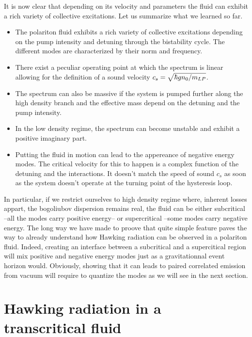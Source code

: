 \bigskip



It is now clear that depending on its velocity and parameters the fluid can exhibit a rich variety of collective excitations. Let us summarize what we learned so far.
\begin{tcolorbox}[infernoSummary]
    \begin{itemize}
        \item The polariton fluid exhibits a rich variety of collective excitations depending on the pump intensity and detuning through the bistability cycle. The different 
        modes are characterized by their norm and frequency.
        \item There exist a peculiar operating point at which the spectrum is linear allowing for the definition of a sound velocity $c_s=\sqrt{\hbar g n_0/m_{LP}}$.
        \item The spectrum can also be massive if the system is pumped further along the high density branch and the effective mass depend on the detuning and the pump intensity.
        \item In the low density regime, the spectrum can become unstable and exhibit a positive imaginary part. 
        \item Putting the fluid in motion can lead to the appereance of negative energy modes. The critical velocity for this to happen is a complex function of the detuning and the interactions. It doesn't 
         match the speed of sound $c_s$ as soon as the system doesn't operate at the turning point of the hysteresis loop.
    \end{itemize}
    \end{tcolorbox}


In particular, if we restrict ourselves to high density regime where, inherent losses appart, the bogoliubov dispersion remains real, the fluid can be either subcritical --all the modes carry positive energy-- or supercritical --some modes carry negative energy.
The long way we have made to proove that quite simple feature paves the way to already understand how Hawking radiation can be observed in a polariton fluid. Indeed, creating 
an interface between a subcritical and a supercitical region will mix positive and negative energy modes just as a gravitationnal event horizon would. Obviously, 
 showing that it can leads to paired correlated emission from vacuum will require to quantize the modes as we will see in the next section.

\section{Hawking radiation in a transcritical fluid}
 


